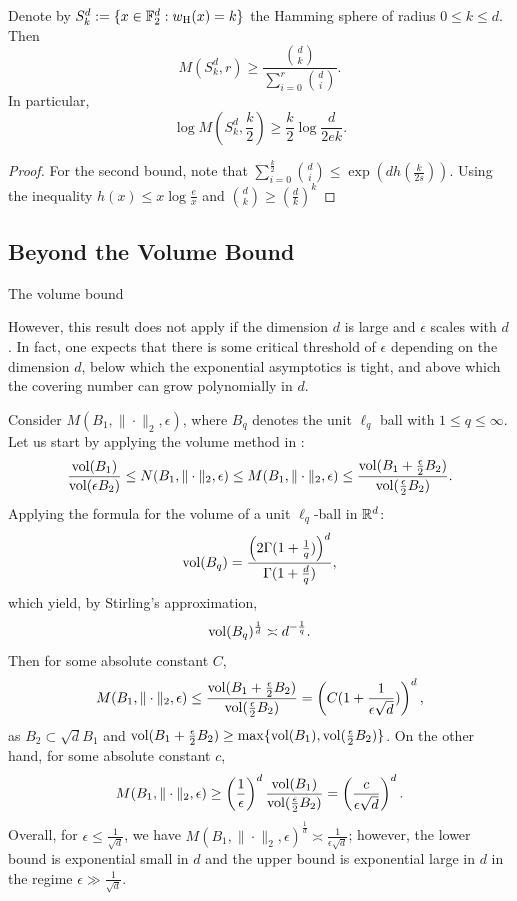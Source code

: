 \begin{theorem}\label{thm:Gilbert-Varshamov}
    Denote by $S^d_k:=\{x\in\mathbb{F}_2^d:w_{\rm H}(x)=k\}$ the Hamming sphere of radius $0\leq k\leq d$. Then 
    \[M(S_k^d,r)\geq \frac{{d\choose{k}}}{\sum_{i=0}^{r}{d\choose{i}}}.\]
    In particular,
    \[\log M(S_k^d,\frac{k}{2})\geq \frac{k}{2}\log\frac{d}{2ek}.\]
\end{theorem}
\begin{proof}
    For the second bound, note that $\sum_{i=0}^{\frac{k}{2}}{d\choose{i}}\leq \exp(dh(\frac{k}{2s}))$.   
    Using the inequality $h(x)\leq x\log\frac{e}{x}$ and ${d\choose{k}}\geq (\frac{d}{k})^k$ 
\end{proof}

\subsection{Beyond the Volume Bound}

The volume bound

However, this result does not apply if the dimension $d$ is large and $\epsilon$ scales with $d$.
In fact, one expects that there is some critical threshold of $\epsilon$ depending on the dimension $d$, below which the exponential asymptotics is tight, and above which the covering number can grow polynomially in $d$.

\begin{example}
    Consider $M(B_1,\|\cdot\|_2,\epsilon)$, where $B_q$ denotes the unit $\ell_q$ ball with $1\leq q\leq \infty$.
    Let us start by applying the volume method in :
    \[\frac{\operatorname{vol}(B_1)}{\operatorname{vol}(\epsilon B_2)}\leq N(B_1,\|\cdot\|_2,\epsilon)\leq M(B_1,\|\cdot\|_2,\epsilon)\leq \frac{\operatorname{vol}(B_1+\frac{\epsilon}{2}B_2)}{\operatorname{vol}(\frac{\epsilon}{2}B_2)}.\]
    Applying the formula for the volume of a unit $\ell_q$-ball in $\mathbb{R}^d$:
    \[\operatorname{vol}(B_q)=\frac{\left(2\Gamma(1+\frac{1}{q})\right)^d}{\Gamma(1+\frac{d}{q})},\]
    which yield, by Stirling's approximation, 
    \[\operatorname{vol}(B_q)^{\frac{1}{d}}\asymp d^{-\frac{1}{q}}.\]
    Then for some absolute constant $C$,
    \[M(B_1,\|\cdot\|_2,\epsilon)\leq\frac{\operatorname{vol}(B_1+\frac{\epsilon}{2}B_2)}{\operatorname{vol}(\frac{\epsilon}{2}B_2)}= \left(C(1+\frac{1}{\epsilon\sqrt{d}})\right)^d,\]
    as $B_2\subset\sqrt{d}B_1$ and $\operatorname{vol}(B_1+\frac{\epsilon}{2}B_2)\geq \max\{\operatorname{vol}(B_1),\operatorname{vol}(\frac{\epsilon}{2}B_2)\}$.
    On the other hand, for some absolute constant $c$,
    \[M(B_1,\|\cdot\|_2,\epsilon)\geq\left(\frac{1}{\epsilon}\right)^d \frac{\operatorname{vol}(B_1)}{\operatorname{vol}(\frac{\epsilon}{2}B_2)}=\left(\frac{c}{\epsilon\sqrt{d}}\right)^d.\]
    Overall, for $\epsilon\leq \frac{1}{\sqrt{d}}$, we have $M(B_1,\|\cdot\|_2,\epsilon)^{\frac{1}{d}}\asymp \frac{1}{\epsilon\sqrt{d}}$; however, the lower bound is exponential small in $d$ and the upper bound is exponential large in $d$ in the regime $\epsilon\gg\frac{1}{\sqrt{d}}$.
\end{example}

